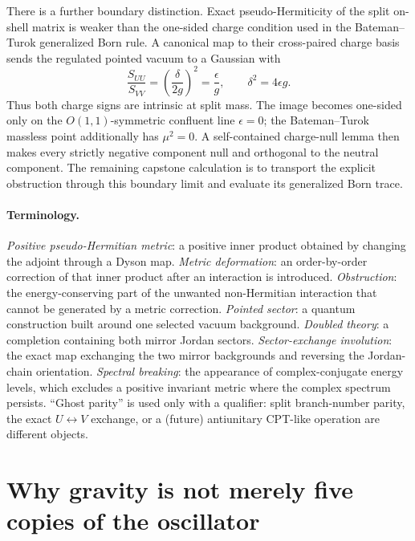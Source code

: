 \documentclass[11pt]{article}
\theoremstyle{remark}
\begin{document}
There is a further boundary distinction.  Exact pseudo-Hermiticity of
the split on-shell matrix is weaker than the one-sided charge condition
used in the Bateman--Turok generalized Born rule.  A canonical map to
their cross-paired charge basis sends the regulated pointed vacuum to a
Gaussian with
\begin{equation}
\frac{S_{UU}}{S_{VV}}=\left(\frac{\delta}{2g}\right)^2
=\frac{\epsilon}{g},
\qquad \delta^2=4\epsilon g .
\end{equation}
Thus both charge signs are intrinsic at split mass.  The image becomes
one-sided only on the $O(1,1)$-symmetric confluent line $\epsilon=0$;
the Bateman--Turok massless point additionally has $\mu^2=0$.  A
self-contained charge-null lemma then makes every strictly negative
component null and orthogonal to the neutral component.  The remaining
capstone calculation is to transport the explicit obstruction through
this boundary limit and evaluate its generalized Born trace.

\paragraph{Terminology.}\leavevmode\par\noindent
\emph{Positive pseudo-Hermitian metric}: a positive inner product
obtained by changing the adjoint through a Dyson map.
\emph{Metric deformation}: an order-by-order correction of that inner
product after an interaction is introduced.
\emph{Obstruction}: the energy-conserving part of the unwanted
non-Hermitian interaction that cannot be generated by a metric
correction.
\emph{Pointed sector}: a quantum construction built around one selected
vacuum background.
\emph{Doubled theory}: a completion containing both mirror Jordan
sectors.
\emph{Sector-exchange involution}: the exact map exchanging the two
mirror backgrounds and reversing the Jordan-chain orientation.
\emph{Spectral breaking}: the appearance of complex-conjugate energy
levels, which excludes a positive invariant metric where the complex
spectrum persists.  ``Ghost parity'' is used only with a qualifier:
split branch-number parity, the exact $U\leftrightarrow V$ exchange, or
a (future) antiunitary CPT-like operation are different objects.

\section{Why gravity is not merely five copies of the oscillator}
\label{sec:gravity}
\end{document}
